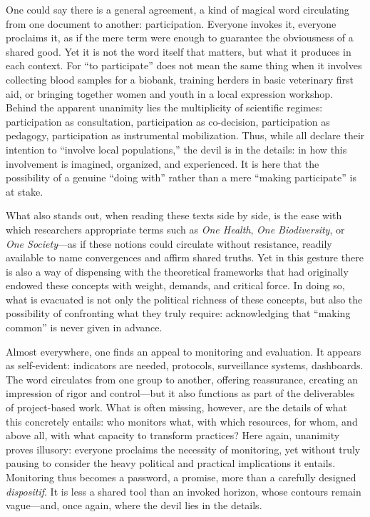 \documentclass{article}
\begin{document}
One could say there is a general agreement, a kind of magical word circulating from one document to another: participation. Everyone invokes it, everyone proclaims it, as if the mere term were enough to guarantee the obviousness of a shared good. Yet it is not the word itself that matters, but what it produces in each context. For “to participate” does not mean the same thing when it involves collecting blood samples for a biobank, training herders in basic veterinary first aid, or bringing together women and youth in a local expression workshop. Behind the apparent unanimity lies the multiplicity of scientific regimes: participation as consultation, participation as co-decision, participation as pedagogy, participation as instrumental mobilization. Thus, while all declare their intention to “involve local populations,” the devil is in the details: in how this involvement is imagined, organized, and experienced. It is here that the possibility of a genuine “doing with” rather than a mere “making participate” is at stake.  

What also stands out, when reading these texts side by side, is the ease with which researchers appropriate terms such as \textit{One Health}, \textit{One Biodiversity}, or \textit{One Society}—as if these notions could circulate without resistance, readily available to name convergences and affirm shared truths. Yet in this gesture there is also a way of dispensing with the theoretical frameworks that had originally endowed these concepts with weight, demands, and critical force. In doing so, what is evacuated is not only the political richness of these concepts, but also the possibility of confronting what they truly require: acknowledging that “making common” is never given in advance.  

Almost everywhere, one finds an appeal to monitoring and evaluation. It appears as self-evident: indicators are needed, protocols, surveillance systems, dashboards. The word circulates from one group to another, offering reassurance, creating an impression of rigor and control—but it also functions as part of the deliverables of project-based work. What is often missing, however, are the details of what this concretely entails: who monitors what, with which resources, for whom, and above all, with what capacity to transform practices? Here again, unanimity proves illusory: everyone proclaims the necessity of monitoring, yet without truly pausing to consider the heavy political and practical implications it entails. Monitoring thus becomes a password, a promise, more than a carefully designed \textit{dispositif}. It is less a shared tool than an invoked horizon, whose contours remain vague—and, once again, where the devil lies in the details.  
\end{document}
